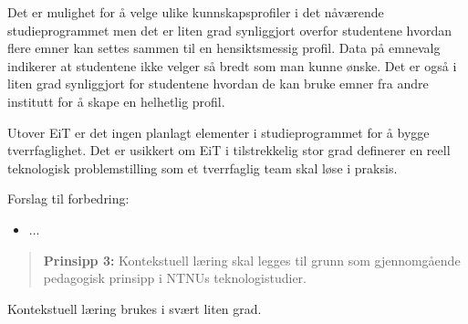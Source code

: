 Det er mulighet for å velge ulike kunnskapsprofiler i det nåværende studieprogrammet men det er liten grad synliggjort overfor studentene hvordan flere emner kan settes sammen til en hensiktsmessig profil. Data på emnevalg indikerer at studentene ikke velger så bredt som man kunne ønske. Det er også i liten grad synliggjort for studentene hvordan de kan bruke emner fra andre institutt for å skape en helhetlig profil.

Utover EiT er det ingen planlagt elementer i studieprogrammet for å bygge tverrfaglighet. Det er usikkert om EiT i tilstrekkelig stor grad definerer en reell teknologisk problemstilling som et tverrfaglig team skal løse i praksis.

Forslag til forbedring:

\begin{itemize}
    \item ...
\end{itemize}

\begin{quote}
	\textbf{Prinsipp 3:} Kontekstuell læring skal legges til grunn som gjennomgående pedagogisk prinsipp i NTNUs teknologistudier.
\end{quote}

Kontekstuell læring brukes i svært liten grad.
